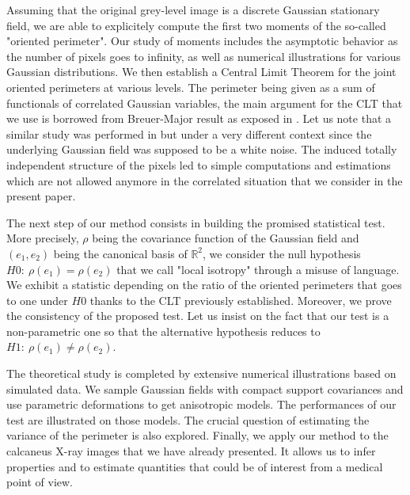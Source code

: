 \documentclass[12pt]{article}
\theoremstyle{Theorem}
\theoremstyle{definition}
\begin{document}
Assuming that the original grey-level image is a discrete Gaussian stationary field, we are able to explicitely compute the first two moments of the so-called "oriented perimeter". Our study of moments includes the asymptotic behavior as the number of pixels goes to infinity, as well as numerical illustrations for various Gaussian distributions. We then establish a Central Limit Theorem for the joint oriented perimeters at various levels. The perimeter being given as a sum of functionals of correlated Gaussian variables, the main argument for the CLT that we use is borrowed from Breuer-Major result as exposed in \cite{Arcones}. Let us note that a similar study was performed in \cite{Psymetrie} but under a very different context since the underlying Gaussian field was supposed to be a white noise. The induced totally independent structure of the pixels led to simple computations and estimations which are not allowed anymore in the correlated situation that we consider in the present paper. 

The next step of our method consists in building the promised statistical test. More precisely, $\rho$ being the covariance function of the Gaussian field and $(e_1,e_2)$ being the canonical basis of $\mathbb R^2$, we consider the null hypothesis $H0:~\rho(e_1)=\rho(e_2)$ that we call "local isotropy" through a misuse of language. We exhibit a statistic depending on the ratio of the oriented perimeters that goes to one under $H0$ thanks to the CLT previously established. Moreover, we prove the consistency of the proposed test. Let us insist on the fact that our test is a non-parametric one so that the alternative hypothesis reduces to $H1:~\rho(e_1)\ne \rho(e_2)$. 

The theoretical study is completed by extensive numerical illustrations based on simulated data. We sample Gaussian fields with compact support covariances and use parametric deformations to get anisotropic models. The performances of our test are illustrated on those models. The crucial question of estimating the variance of the perimeter is also explored. Finally, we apply our method to the calcaneus X-ray images that we have already presented. It allows us to infer properties and to estimate quantities that could be of interest from a medical point of view. 

\bigskip
\end{document}
